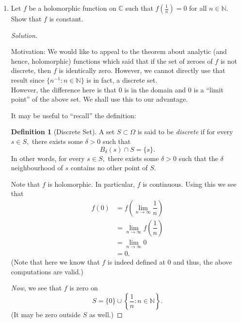 \documentclass[12pt]{article}
\theoremstyle{definition}
\numberwithin{thm}{section}
\newtheorem{defn}[thm]{Definition}
\newenvironment{blockquote}
{\begin{mdframed}[skipabove=0pt, skipbelow=0pt, innertopmargin=4pt, innerbottommargin=4pt, bottomline=false,topline=false,rightline=false, linewidth=2pt]}
{\end{mdframed}}
\newenvironment{soln}{\begin{proof}[Solution]}{\end{proof}}
\begin{document}
\begin{enumerate}
\begin{soln}
\begin{equation*}
			f(2) = \sin\left(\dfrac{\pi}{2}\right) = 1 \neq 0. \qedhere
		\end{equation*}
	\end{soln}
	\item Let $f$ be a holomorphic function on $\mathbb{C}$ such that $f\left(\frac{1}{n}\right) = 0$ for all $n \in \mathbb{N}.$ Show that $f$ is constant.
	\begin{soln}\phantom{hi}\\
		\begin{blockquote}
		Motivation: We would like to appeal to the theorem about analytic (and hence, holomorphic) functions which said that if the set of zeroes of $f$ is not discrete, then $f$ is identically zero. However, we cannot directly use that result since $\{n^{-1} : n \in \mathbb{N}\}$ is in fact, a discrete set.\\
		However, the difference here is that $0$ is in the domain and $0$ is a ``limit point'' of the above set. We shall use this to our advantage.

		It may be useful to ``recall'' the definition:

		\begin{defn}[Discrete Set]
			A set $S \subset \Omega$ is said to be \emph{discrete} if for every $s \in S,$ there exists some $\delta > 0$ such that
			\begin{equation*} 
				B_\delta(s) \cap S = \{s\}.
			\end{equation*}
			In other words, for every $s \in S,$ there exists some $\delta > 0$ such that the $\delta$ neighbourhood of $s$ contains no other point of $S.$
		\end{defn}
		\end{blockquote}

		Note that $f$ is holomorphic. In particular, $f$ is continuous. Using this we see that
		\begin{align*} 
			f(0) &= f\left(\lim_{n\to \infty}\dfrac{1}{n}\right)\\
			&=\lim_{n\to \infty}f\left(\dfrac{1}{n}\right)\\
			&= \lim_{n\to \infty}0\\
			&= 0.
		\end{align*}
		(Note that here we know that $f$ is indeed defined at $0$ and thus, the above computations are valid.)

		\emph{Now}, we see that $f$ is zero on
		\begin{equation*} 
			S = \{0\}\cup\left\{\dfrac{1}{n} : n \in \mathbb{N}\right\}.
		\end{equation*}
		(It may be zero outside $S$ as well.)


\end{soln}
\end{enumerate}
\end{document}

